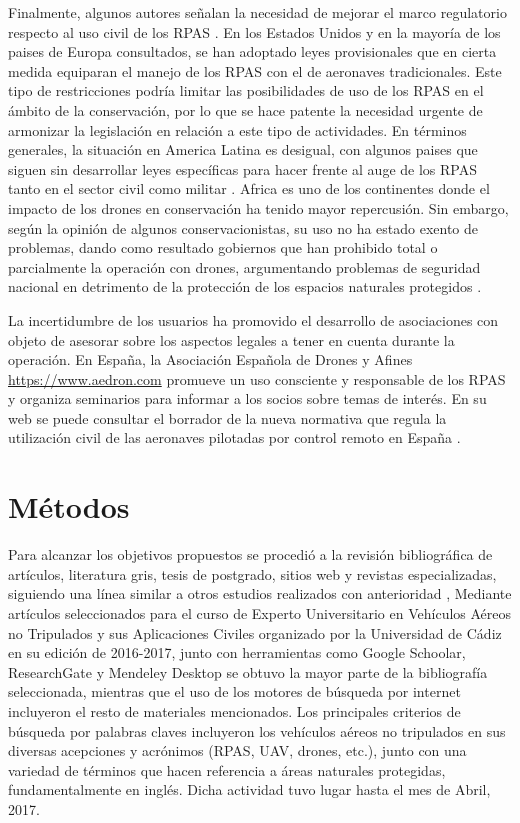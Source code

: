 \documentclass[11pt,]{article}
\begin{document}
Finalmente, algunos autores señalan la necesidad de mejorar el marco
regulatorio respecto al uso civil de los RPAS \citep{Nugraha2016}. En
los Estados Unidos y en la mayoría de los paises de Europa consultados,
se han adoptado leyes provisionales que en cierta medida equiparan el
manejo de los RPAS con el de aeronaves tradicionales. Este tipo de
restricciones podría limitar las posibilidades de uso de los RPAS en el
ámbito de la conservación, por lo que se hace patente la necesidad
urgente de armonizar la legislación en relación a este tipo de
actividades. En términos generales, la situación en America Latina es
desigual, con algunos paises que siguen sin desarrollar leyes
específicas para hacer frente al auge de los RPAS tanto en el sector
civil como militar \citep{Nacion2013}. Africa es uno de los continentes
donde el impacto de los drones en conservación ha tenido mayor
repercusión. Sin embargo, según la opinión de algunos conservacionistas,
su uso no ha estado exento de problemas, dando como resultado gobiernos
que han prohibido total o parcialmente la operación con drones,
argumentando problemas de seguridad nacional en detrimento de la
protección de los espacios naturales protegidos \citep{Andrews2014}.

La incertidumbre de los usuarios ha promovido el desarrollo de
asociaciones con objeto de asesorar sobre los aspectos legales a tener
en cuenta durante la operación. En España, la Asociación Española de
Drones y Afines \url{https://www.aedron.com} promueve un uso consciente
y responsable de los RPAS y organiza seminarios para informar a los
socios sobre temas de interés. En su web se puede consultar el borrador
de la nueva normativa que regula la utilización civil de las aeronaves
pilotadas por control remoto en España \citep{Aedron2017}.

\section{Métodos}\label{metodos}

Para alcanzar los objetivos propuestos se procedió a la revisión
bibliográfica de artículos, literatura gris, tesis de postgrado, sitios
web y revistas especializadas, siguiendo una línea similar a otros
estudios realizados con anterioridad \citet{Linchant2015},
\citep{Christie2016} Mediante artículos seleccionados para el curso de
Experto Universitario en Vehículos Aéreos no Tripulados y sus
Aplicaciones Civiles organizado por la Universidad de Cádiz en su
edición de 2016-2017, junto con herramientas como Google Schoolar,
ResearchGate y Mendeley Desktop se obtuvo la mayor parte de la
bibliografía seleccionada, mientras que el uso de los motores de
búsqueda por internet incluyeron el resto de materiales mencionados. Los
principales criterios de búsqueda por palabras claves incluyeron los
vehículos aéreos no tripulados en sus diversas acepciones y acrónimos
(RPAS, UAV, drones, etc.), junto con una variedad de términos que hacen
referencia a áreas naturales protegidas, fundamentalmente en inglés.
Dicha actividad tuvo lugar hasta el mes de Abril, 2017.
\end{document}
